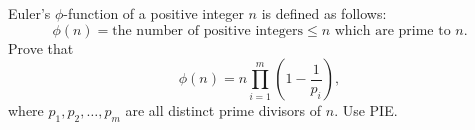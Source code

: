 Euler's $\phi$-function of a positive integer $n$ is defined as follows:
\[ \phi(n) = \text{the number of positive integers} \leq n \text{ which are prime to } n. \]
Prove that
\[ \phi(n) = n\prod_{i=1}^m \left(1 - \frac{1}{p_i}\right), \]
where $p_1, p_2, \ldots, p_m$ are all distinct prime divisors of $n$. Use PIE.
